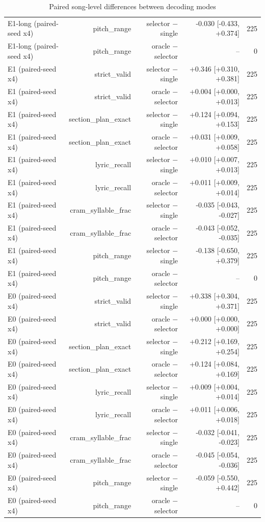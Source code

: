 \begin{table}[t]
\begin{tabular}{lrrrr}
E1-long (paired-seed x4) & pitch\_range & selector $-$ single & -0.030 [-0.433, +0.374] & 225 \\
E1-long (paired-seed x4) & pitch\_range & oracle $-$ selector & – & 0 \\
E1 (paired-seed x4) & strict\_valid & selector $-$ single & +0.346 [+0.310, +0.381] & 225 \\
E1 (paired-seed x4) & strict\_valid & oracle $-$ selector & +0.004 [+0.000, +0.013] & 225 \\
E1 (paired-seed x4) & section\_plan\_exact & selector $-$ single & +0.124 [+0.094, +0.153] & 225 \\
E1 (paired-seed x4) & section\_plan\_exact & oracle $-$ selector & +0.031 [+0.009, +0.058] & 225 \\
E1 (paired-seed x4) & lyric\_recall & selector $-$ single & +0.010 [+0.007, +0.013] & 225 \\
E1 (paired-seed x4) & lyric\_recall & oracle $-$ selector & +0.011 [+0.009, +0.014] & 225 \\
E1 (paired-seed x4) & cram\_syllable\_frac & selector $-$ single & -0.035 [-0.043, -0.027] & 225 \\
E1 (paired-seed x4) & cram\_syllable\_frac & oracle $-$ selector & -0.043 [-0.052, -0.035] & 225 \\
E1 (paired-seed x4) & pitch\_range & selector $-$ single & -0.138 [-0.650, +0.379] & 225 \\
E1 (paired-seed x4) & pitch\_range & oracle $-$ selector & – & 0 \\
E0 (paired-seed x4) & strict\_valid & selector $-$ single & +0.338 [+0.304, +0.371] & 225 \\
E0 (paired-seed x4) & strict\_valid & oracle $-$ selector & +0.000 [+0.000, +0.000] & 225 \\
E0 (paired-seed x4) & section\_plan\_exact & selector $-$ single & +0.212 [+0.169, +0.254] & 225 \\
E0 (paired-seed x4) & section\_plan\_exact & oracle $-$ selector & +0.124 [+0.084, +0.169] & 225 \\
E0 (paired-seed x4) & lyric\_recall & selector $-$ single & +0.009 [+0.004, +0.014] & 225 \\
E0 (paired-seed x4) & lyric\_recall & oracle $-$ selector & +0.011 [+0.006, +0.018] & 225 \\
E0 (paired-seed x4) & cram\_syllable\_frac & selector $-$ single & -0.032 [-0.041, -0.023] & 225 \\
E0 (paired-seed x4) & cram\_syllable\_frac & oracle $-$ selector & -0.045 [-0.054, -0.036] & 225 \\
E0 (paired-seed x4) & pitch\_range & selector $-$ single & -0.059 [-0.550, +0.442] & 225 \\
E0 (paired-seed x4) & pitch\_range & oracle $-$ selector & – & 0 \\
\bottomrule
\end{tabular}
\caption{Paired song-level differences between decoding modes}
\label{tab:decoding_deltas}
\end{table}
